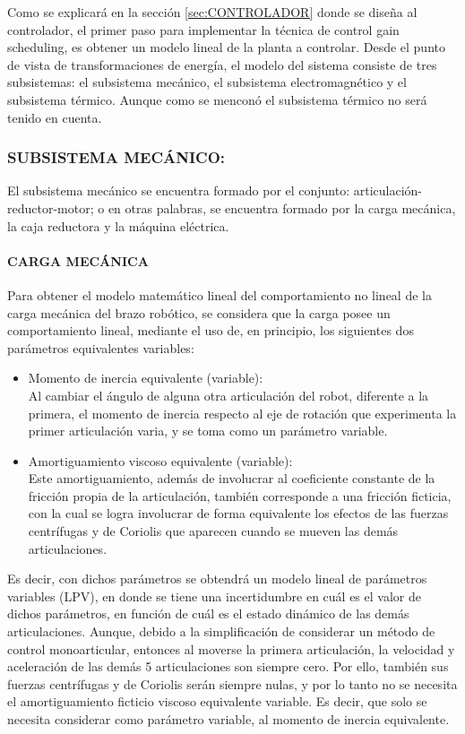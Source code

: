\documentclass{article}
\begin{document}
\begin{sloppypar}
Como se explicará en la sección \ref{sec:CONTROLADOR} donde se diseña al controlador, el primer paso para implementar la técnica de control gain scheduling, es obtener un modelo lineal de la planta a controlar.
Desde el punto de vista de transformaciones de energía, el modelo del sistema consiste de tres subsistemas: el subsistema mecánico, el subsistema electromagnético y el subsistema térmico. Aunque como se menconó el subsistema térmico no será tenido en cuenta.

\subsubsection{SUBSISTEMA MECÁNICO:}
\label{sec:SUBSISTEMA MECÁNICO:}

El subsistema mecánico se encuentra formado por el conjunto: articulación-reductor-motor; o en otras palabras, se encuentra formado por la carga mecánica, la caja reductora y la máquina eléctrica.

\paragraph{\textbf{CARGA MECÁNICA}}
\label{sec:CARGA MECÁNICA}
\hfill

\hfill

Para obtener el modelo matemático lineal del comportamiento no lineal de la carga mecánica del brazo robótico, se considera que
la carga posee un comportamiento lineal, mediante el uso de, en principio, los siguientes dos parámetros equivalentes variables:
\begin{itemize}
    \item Momento de inercia equivalente (variable):
    \\ Al cambiar el ángulo de alguna otra articulación del robot, diferente a la primera, el momento de inercia respecto al eje de rotación que experimenta la primer articulación varia, y se toma como un parámetro variable.

    \item Amortiguamiento viscoso equivalente (variable):
    \\ Este amortiguamiento, además de involucrar al coeficiente constante de la fricción  propia de la articulación, también corresponde a una fricción ficticia, con la cual se logra involucrar de forma equivalente los efectos de las fuerzas centrífugas y de Coriolis que aparecen cuando se mueven las demás articulaciones.
\end{itemize}
Es decir, con dichos parámetros se obtendrá un modelo lineal de parámetros variables (LPV), en donde se tiene una incertidumbre en cuál es el valor de dichos parámetros, en función de cuál es el estado dinámico de las demás articulaciones.
Aunque, debido a la simplificación de considerar un método de control monoarticular, entonces al moverse la primera articulación, la velocidad y aceleración de las demás 5 articulaciones son siempre cero. Por ello, también sus fuerzas centrífugas y de Coriolis serán siempre nulas, y por lo tanto no se necesita el amortiguamiento ficticio viscoso equivalente variable. Es decir, que solo se necesita considerar como parámetro variable, al momento de inercia equivalente.


\end{sloppypar}
\end{document}
